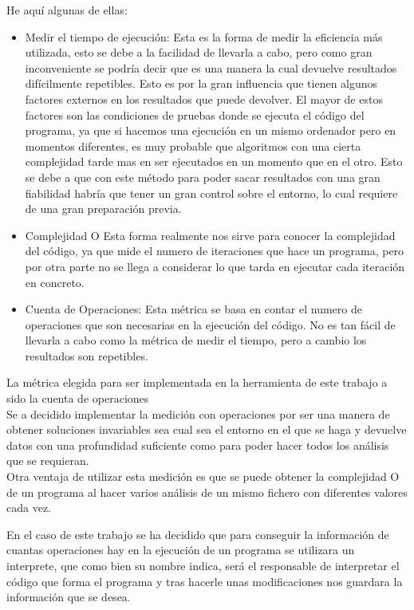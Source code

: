 He aquí algunas de ellas:
\begin{itemize}
	\item Medir el tiempo de ejecución: Esta es la forma de medir la eficiencia más utilizada, esto se debe a la facilidad de llevarla a cabo, pero como gran inconveniente se podría decir que es una manera la cual devuelve resultados difícilmente repetibles. Esto es por la gran influencia que tienen algunos factores externos en los resultados que puede devolver. El mayor de estos factores son las condiciones de pruebas donde se ejecuta el código del programa, ya que si hacemos una ejecución en un mismo ordenador pero en momentos diferentes, es muy probable que algoritmos con una cierta complejidad tarde mas en ser ejecutados en un momento que en el otro. Esto se debe a que con este método para poder sacar resultados con una gran fiabilidad habría que tener un gran control sobre el entorno, lo cual requiere de una gran preparación previa.
	\item Complejidad O\cite{O} Esta forma realmente nos sirve para conocer la complejidad del código, ya que mide el numero de iteraciones que hace un programa, pero por otra parte no se llega a considerar lo que tarda en ejecutar cada iteración en concreto.
	
	\item Cuenta de Operaciones: Esta métrica se basa en contar el numero de operaciones que son necesarias en la ejecución del código. No es tan fácil de llevarla a cabo como la métrica de medir el tiempo, pero a cambio los resultados son repetibles.

\end{itemize}

La métrica elegida para ser implementada en la herramienta de este trabajo a sido la cuenta de operaciones\\
 
Se a decidido implementar la medición con operaciones por ser una manera de obtener soluciones invariables sea cual sea el entorno en el que se haga y devuelve datos con una profundidad suficiente como para poder hacer todos los análisis que se requieran. \\

Otra ventaja de utilizar esta medición es que se puede obtener la complejidad O de un programa al hacer varios análisis de un mismo fichero con diferentes valores cada vez.

En el caso de este trabajo se ha decidido que para conseguir la información de cuantas operaciones hay en la ejecución de un programa se utilizara un interprete\cite{interprete}, que como bien su nombre indica, será el responsable de interpretar el código que forma el programa y tras hacerle unas modificaciones nos guardara  la información que se desea. 



